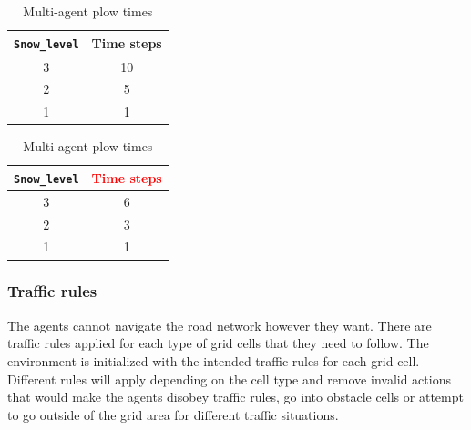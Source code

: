 \documentclass{scrartcl}
\theoremstyle{mytheoremstyle}
\theoremstyle{mytheoremstyle}
\theoremstyle{myproblemstyle}
\begin{document}
\begin{table}[H]
    \begin{minipage}{.5\linewidth}
        \centering
        \begin{tabular}{|c|c|}
            \hline
            \texttt{Snow\_level} & \textbf{Time steps} \\
            \hline
            3                    & 10                  \\
            \hline
            2                    & 5                   \\
            \hline
            1                    & 1                   \\
            \hline
        \end{tabular}
        \caption{Single agent plow times}
        \label{tab:single_plow_time}
    \end{minipage}
    \begin{minipage}{.5\linewidth}
        \centering
        \begin{tabular}{|c|c|}
            \hline
            \texttt{Snow\_level} & \textbf{\textcolor{red}{Time steps}} \\
            \hline
            3                    & 6                                    \\
            \hline
            2                    & 3                                    \\
            \hline
            1                    & 1                                    \\
            \hline
        \end{tabular}
        \caption{Multi-agent plow times}
        \label{tab:multi_plow_time}
    \end{minipage}
\end{table}

\subsubsection{Traffic rules}

The agents cannot navigate the road network however they want. There are traffic rules applied for each type of grid cells that they need to follow. The environment is initialized with the intended traffic rules for each grid cell. Different rules will apply depending on the cell type and remove invalid actions that would make the agents disobey traffic rules, go into obstacle cells or attempt to go outside of the grid area for different traffic situations.
\end{document}

